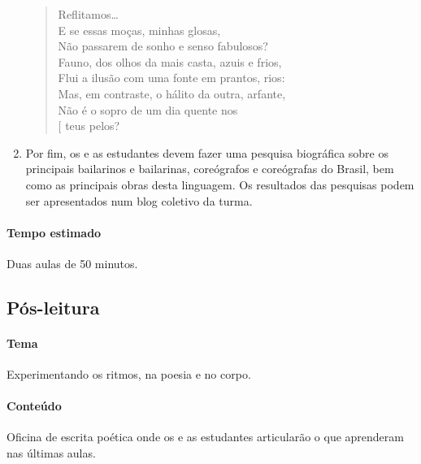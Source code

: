 \documentclass[12pt]{extarticle}
\begin{document}
\begin{enumerate}
\begin{verse}
Reflitamos…\\
        \hspace{2cm}         E se essas moças, minhas glosas,\\
Não passarem de sonho e senso fabulosos?\\
Fauno, dos olhos da mais casta, azuis e frios,\\
Flui a ilusão com uma fonte em prantos, rios:\\
Mas, em contraste, o hálito da outra, arfante,\\
Não é o sopro de um dia quente nos\\
\hfill $[$ teus pelos?
\end{verse}


  \item
  Por fim, os e as estudantes devem fazer uma pesquisa biográfica
  sobre os principais bailarinos e bailarinas, coreógrafos 
  e coreógrafas do Brasil, bem como as principais obras desta linguagem. 
  Os resultados das pesquisas podem ser apresentados num blog coletivo da
  turma.

\end{enumerate}

\paragraph{Tempo estimado} Duas aulas de 50 minutos.









\subsection{Pós-leitura}



\paragraph{Tema} Experimentando os ritmos, na poesia e no corpo.

\paragraph{Conteúdo} Oficina de escrita poética onde os e as estudantes 
articularão o que aprenderam nas últimas aulas.
\end{document}

